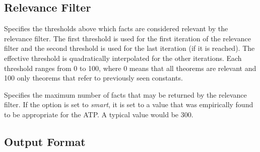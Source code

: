 \documentclass[a4paper,12pt]{article}
\begin{document}
\subsection{Relevance Filter}
\label{relevance-filter}

\begin{enum}
Specifies the thresholds above which facts are considered relevant by the
relevance filter. The first threshold is used for the first iteration of the
relevance filter and the second threshold is used for the last iteration (if it
is reached). The effective threshold is quadratically interpolated for the other
iterations. Each threshold ranges from 0 to 100, where 0 means that all theorems
are relevant and 100 only theorems that refer to previously seen constants.

Specifies the maximum number of facts that may be returned by the relevance
filter. If the option is set to \textit{smart}, it is set to a value that was
empirically found to be appropriate for the ATP. A typical value would be 300.


\end{enum}

\subsection{Output Format}
\label{output-format}
\end{document}
